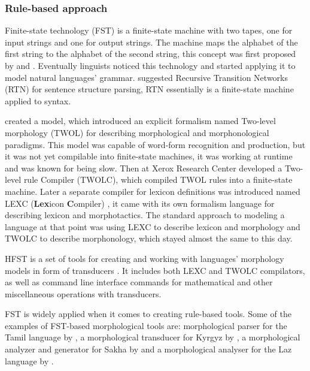 \subsubsection{Rule-based approach}
\par Finite-state technology (FST) is a finite-state machine with two tapes, one for input strings and one for output strings. The machine maps the alphabet of the first string to the alphabet of the second string, this concept was first proposed by \textcite{mealy_method_1955} and \textcite{moore_gedanken_1955}. Eventually linguists noticed this technology and started applying it to model natural languages' grammar. \textcite{woods_trans_1970} suggested Recursive Transition Networks (RTN) for sentence structure parsing, RTN essentially is a finite-state machine applied to syntax. 
\par \textcite{koskenniemi_twol_1983} created a model, which introduced an explicit formalism named Two-level morphology (TWOL) for describing morphological and morphonological paradigms. This model was capable of word-form recognition and production, but it was not yet compilable into finite-state machines, it was working at runtime and was known for being slow. Then \textcite{karttunen_twolc_1987} at Xerox Research Center developed a Two-level rule Compiler (TWOLC), which compiled TWOL rules into a finite-state machine. Later a separate compiler for lexicon definitions was introduced named LEXC (\textbf{Lex}icon \textbf{C}ompiler) \parencite{karttunen_lexc_1993}, it came with its own formalism language for describing lexicon and morphotactics. The standard approach to modeling a language at that point was using LEXC to describe lexicon and morphology and TWOLC to describe morphonology, which stayed almost the same to this day. 
\par HFST is a set of tools for creating and working with languages' morphology models in form of transducers \parencite{linden_hfst_2009}. It includes both LEXC and TWOLC compilators, as well as command line interface commands for mathematical and other miscellaneous operations with transducers. 
\par {}
\par FST is widely applied when it comes to creating rule-based tools. Some of the examples of FST-based morphological tools are: morphological parser for the Tamil language by \textcite{sarveswaran_morph_2021}, a morphological transducer for Kyrgyz by \textcite{washington_finite_2012}, a morphological analyzer and generator for Sakha by \textcite{ivanova_free_2022} and a morphological analyser for the Laz language by \textcite{onal_building_2019}.
